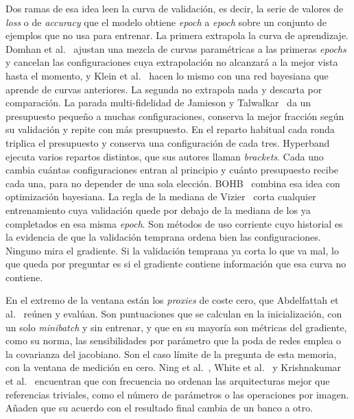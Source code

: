 Dos ramas de esa idea leen la curva de validación, es decir, la serie de valores de \emph{loss} o de \emph{accuracy} que el modelo obtiene \emph{epoch} a \emph{epoch} sobre un conjunto de ejemplos que no usa para entrenar. La primera extrapola la curva de aprendizaje. Domhan et al.~\cite{domhan2015speeding} ajustan una mezcla de curvas paramétricas a las primeras \emph{epochs} y cancelan las configuraciones cuya extrapolación no alcanzará a la mejor vista hasta el momento, y Klein et al.~\cite{klein2017learning} hacen lo mismo con una red bayesiana que aprende de curvas anteriores. La segunda no extrapola nada y descarta por comparación. La parada multi-fidelidad de Jamieson y Talwalkar~\cite{jamieson2016nonstochastic} da un presupuesto pequeño a muchas configuraciones, conserva la mejor fracción según su validación y repite con más presupuesto. En el reparto habitual cada ronda triplica el presupuesto y conserva una configuración de cada tres. Hyperband~\cite{li2018hyperband} ejecuta varios repartos distintos, que sus autores llaman \emph{brackets}. Cada uno cambia cuántas configuraciones entran al principio y cuánto presupuesto recibe cada una, para no depender de una sola elección. BOHB~\cite{falkner2018bohb} combina esa idea con optimización bayesiana. La regla de la mediana de Vizier~\cite{golovin2017vizier} corta cualquier entrenamiento cuya validación quede por debajo de la mediana de los ya completados en esa misma \emph{epoch}. Son métodos de uso corriente cuyo historial es la evidencia de que la validación temprana ordena bien las configuraciones. Ninguno mira el gradiente. Si la validación temprana ya corta lo que va mal, lo que queda por preguntar es si el gradiente contiene información que esa curva no contiene.

En el extremo de la ventana están los \emph{proxies} de coste cero, que Abdelfattah et al.~\cite{abdelfattah2021zerocost} reúnen y evalúan. Son puntuaciones que se calculan en la inicialización, con un solo \emph{minibatch} y sin entrenar, y que en su mayoría son métricas del gradiente, como su norma, las sensibilidades por parámetro que la poda de redes emplea o la covarianza del jacobiano. Son el caso límite de la pregunta de esta memoria, con la ventana de medición en cero. Ning et al.~\cite{ning2021evaluating}, White et al.~\cite{white2022deeper} y Krishnakumar et al.~\cite{krishnakumar2022nasbenchsuitezero} encuentran que con frecuencia no ordenan las arquitecturas mejor que referencias triviales, como el número de parámetros o las operaciones por imagen. Añaden que su acuerdo con el resultado final cambia de un banco a otro.

